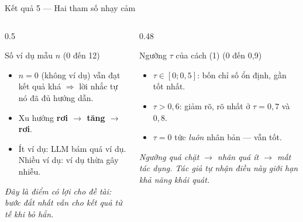 \documentclass[aspectratio=169,10pt]{beamer}
\begin{document}
\begin{frame}{Kết quả 5 --- Hai tham số nhạy cảm}
  \begin{columns}[T]
    \begin{column}{0.5\textwidth}
      \begin{block}{\small Số ví dụ mẫu $n$ (0 đến 12)}
        \begin{itemize}\footnotesize
          \item $n = 0$ (không ví dụ) vẫn đạt kết quả khá $\Rightarrow$ lời nhắc tự nó
                đã đủ hướng dẫn.
          \item Xu hướng \textbf{rơi $\rightarrow$ tăng $\rightarrow$ rơi}.
          \item Ít ví dụ: LLM bám quá ví dụ. Nhiều ví dụ: ví dụ thừa gây nhiễu.
        \end{itemize}
        \vspace{0.2em}
        {\footnotesize\itshape Đây là điểm có lợi cho đề tài: bước đắt nhất vẫn cho kết quả
        tử tế khi bỏ hẳn.}
      \end{block}
    \end{column}
    \begin{column}{0.48\textwidth}
      \begin{block}{\small Ngưỡng $\tau$ của cách (1) (0 đến 0{,}9)}
        \begin{itemize}\footnotesize
          \item $\tau \in [0; 0{,}5]$: bốn chỉ số ổn định, gần tốt nhất.
          \item $\tau > 0{,}6$: giảm rõ, rõ nhất ở $\tau = 0{,}7$ và $0{,}8$.
          \item $\tau = 0$ tức \emph{luôn} nhân bản --- vẫn tốt.
        \end{itemize}
        \vspace{0.2em}
        {\footnotesize\itshape Ngưỡng quá chặt $\rightarrow$ nhân quá ít $\rightarrow$ mất tác dụng.
        Tác giả tự nhận điều này giới hạn khả năng khái quát.}
      \end{block}
    \end{column}
  \end{columns}
\end{frame}
\end{document}
